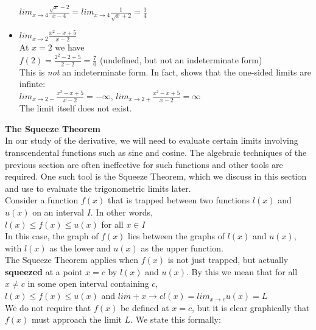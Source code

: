 \documentclass{article}
\begin{document}
\begin{itemize}
				$lim_{x \to 4}\frac{\sqrt{x} - 2}{x - 4} = lim_{x \to 4}\frac{1}{\sqrt{x} + 2} = \frac{1}{4}$

			\item $lim_{x \to 2}\frac{x^2 - x + 5}{x - 2}$\\
				At $x = 2$ we have\\
				
$f(2) = \frac{2^2 - 2 + 5}{2 - 2} = \frac{7}{0}$ (undefined, but not an indeterminate form)\\
				This is \textit{not} an indeterminate form. In fact, shows that the one-sided limits are infinte:\\

				$lim_{x \to 2-}\frac{x^2 - x + 5}{x - 2} = -\infty$, $lim_{x \to 2+}\frac{x^2 - x + 5}{x - 2} = \infty$\\

				The limit itself does not exist.
		\end{itemize}

	\textbf{The Squeeze Theorem}\\
	In our study of the derivative, we will need to evaluate certain limits involving transcendental functions such as sine and cosine. The algebraic techniques of the previous section are often ineffective for such functions and other tools are required. One such tool is the Squeeze Theorem, which we discuss in this section and use to evaluate the trigonometric limits later.\\

	Consider a function $f(x)$ that is trapped between two functions $l(x)$ and $u(x)$ on an interval $I$. In other words,\\

	$l(x) \leq f(x) \leq u(x)$ for all $x \in I$\\

	In this case, the graph of $f(x)$ lies between the graphs of $l(x)$ and $u(x)$, with $l(x)$ as the lower and $u(x)$ as the upper function.\\

	The Squeeze Theorem applies when $f(x)$ is not just trapped, but actually \textbf{squeezed} at a point $x = c$ by $l(x)$ and $u(x)$. By this we mean that for all $x \neq c$ in some open interval containing $c$,\\

	$l(x) \leq f(x) \leq u(x)$ and $lim+{x \to c}l(x) = lim_{x \to c}u(x) = L$\\

	We do not require that $f(x)$ be defined at $x = c$, but it is clear graphically that $f(x)$ must approach the limit $L$. We state this formally:\\
\end{document}
